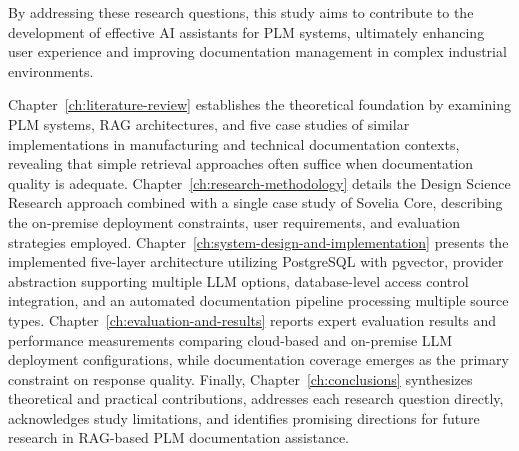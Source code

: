 By addressing these research questions, this study aims to contribute to the development of effective AI assistants for PLM systems, ultimately enhancing user experience and improving documentation management in complex industrial environments.

Chapter~\ref{ch:literature-review} establishes the theoretical foundation by examining PLM systems, RAG architectures, and five case studies of similar implementations in manufacturing and technical documentation contexts, revealing that simple retrieval approaches often suffice when documentation quality is adequate. Chapter~\ref{ch:research-methodology} details the Design Science Research approach combined with a single case study of Sovelia Core, describing the on-premise deployment constraints, user requirements, and evaluation strategies employed. Chapter~\ref{ch:system-design-and-implementation} presents the implemented five-layer architecture utilizing PostgreSQL with pgvector, provider abstraction supporting multiple LLM options, database-level access control integration, and an automated documentation pipeline processing multiple source types. Chapter~\ref{ch:evaluation-and-results} reports expert evaluation results and performance measurements comparing cloud-based and on-premise LLM deployment configurations, while documentation coverage emerges as the primary constraint on response quality. Finally, Chapter~\ref{ch:conclusions} synthesizes theoretical and practical contributions, addresses each research question directly, acknowledges study limitations, and identifies promising directions for future research in RAG-based PLM documentation assistance.
